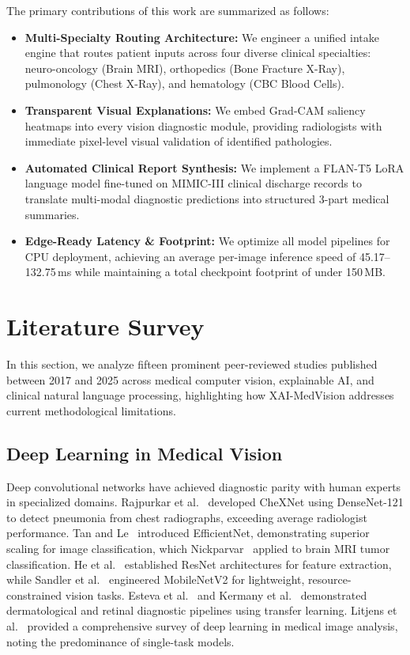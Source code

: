 \documentclass[conference]{IEEEtran}
\begin{document}
The primary contributions of this work are summarized as follows:
\begin{itemize}
    \item \textbf{Multi-Specialty Routing Architecture:} We engineer a unified intake engine that routes patient inputs across four diverse clinical specialties: neuro-oncology (Brain MRI), orthopedics (Bone Fracture X-Ray), pulmonology (Chest X-Ray), and hematology (CBC Blood Cells).
    \item \textbf{Transparent Visual Explanations:} We embed Grad-CAM saliency heatmaps into every vision diagnostic module, providing radiologists with immediate pixel-level visual validation of identified pathologies.
    \item \textbf{Automated Clinical Report Synthesis:} We implement a FLAN-T5 LoRA language model fine-tuned on MIMIC-III clinical discharge records to translate multi-modal diagnostic predictions into structured 3-part medical summaries.
    \item \textbf{Edge-Ready Latency & Footprint:} We optimize all model pipelines for CPU deployment, achieving an average per-image inference speed of 45.17--132.75\,ms while maintaining a total checkpoint footprint of under 150\,MB.
\end{itemize}

\section{Literature Survey}
In this section, we analyze fifteen prominent peer-reviewed studies published between 2017 and 2025 across medical computer vision, explainable AI, and clinical natural language processing, highlighting how XAI-MedVision addresses current methodological limitations.

\subsection{Deep Learning in Medical Vision}
Deep convolutional networks have achieved diagnostic parity with human experts in specialized domains. Rajpurkar et al.~\cite{b1} developed CheXNet using DenseNet-121 to detect pneumonia from chest radiographs, exceeding average radiologist performance. Tan and Le~\cite{b6} introduced EfficientNet, demonstrating superior scaling for image classification, which Nickparvar~\cite{b9} applied to brain MRI tumor classification. He et al.~\cite{b7} established ResNet architectures for feature extraction, while Sandler et al.~\cite{b8} engineered MobileNetV2 for lightweight, resource-constrained vision tasks. Esteva et al.~\cite{b12} and Kermany et al.~\cite{b13} demonstrated dermatological and retinal diagnostic pipelines using transfer learning. Litjens et al.~\cite{b14} provided a comprehensive survey of deep learning in medical image analysis, noting the predominance of single-task models.
\end{document}
